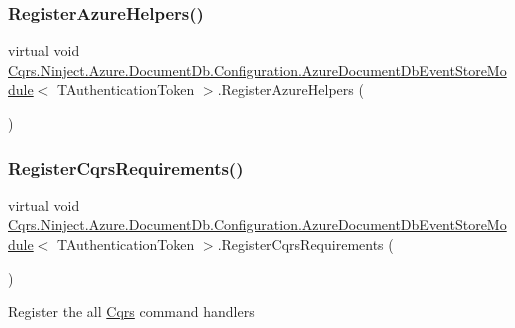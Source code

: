 \subsubsection{\texorpdfstring{Register\+Azure\+Helpers()}{RegisterAzureHelpers()}}
{\footnotesize\ttfamily virtual void \hyperlink{classCqrs_1_1Ninject_1_1Azure_1_1DocumentDb_1_1Configuration_1_1AzureDocumentDbEventStoreModule}{Cqrs.\+Ninject.\+Azure.\+Document\+Db.\+Configuration.\+Azure\+Document\+Db\+Event\+Store\+Module}$<$ T\+Authentication\+Token $>$.Register\+Azure\+Helpers (\begin{DoxyParamCaption}{ }\end{DoxyParamCaption})\hspace{0.3cm}{\ttfamily [virtual]}}

\mbox{\label{classCqrs_1_1Ninject_1_1Azure_1_1DocumentDb_1_1Configuration_1_1AzureDocumentDbEventStoreModule_a5399c945398ff555c488ce001fc31e34_a5399c945398ff555c488ce001fc31e34}} 
\subsubsection{\texorpdfstring{Register\+Cqrs\+Requirements()}{RegisterCqrsRequirements()}}
{\footnotesize\ttfamily virtual void \hyperlink{classCqrs_1_1Ninject_1_1Azure_1_1DocumentDb_1_1Configuration_1_1AzureDocumentDbEventStoreModule}{Cqrs.\+Ninject.\+Azure.\+Document\+Db.\+Configuration.\+Azure\+Document\+Db\+Event\+Store\+Module}$<$ T\+Authentication\+Token $>$.Register\+Cqrs\+Requirements (\begin{DoxyParamCaption}{ }\end{DoxyParamCaption})\hspace{0.3cm}{\ttfamily [virtual]}}



Register the all \hyperlink{namespaceCqrs}{Cqrs} command handlers 

